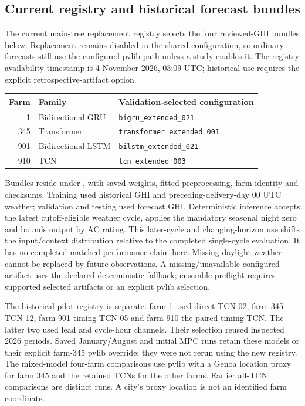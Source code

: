 \documentclass[11pt,a4paper]{article}
\begin{document}
\subsection{Current registry and historical forecast bundles}
The current main-tree replacement registry selects the four reviewed-GHI
bundles below. Replacement remains disabled in the shared configuration, so
ordinary forecasts still use the configured pvlib path unless a study enables
it. The registry availability timestamp is 4 November 2026, 03:09 UTC;
historical use requires the explicit retrospective-artifact option.
\begin{center}\small
\begin{tabular}{rll}
\toprule Farm & Family & Validation-selected configuration\\\midrule
1 & Bidirectional GRU & \texttt{bigru\_extended\_021}\\
345 & Transformer & \texttt{transformer\_extended\_001}\\
901 & Bidirectional LSTM & \texttt{bilstm\_extended\_021}\\
910 & TCN & \texttt{tcn\_extended\_003}\\
\bottomrule\end{tabular}\end{center}
Bundles reside under , with saved
weights, fitted preprocessing, farm identity and checksums. Training used
historical GHI and preceding-delivery-day 00 UTC weather; validation and testing
used forecast GHI. Deterministic inference accepts the latest cutoff-eligible
weather cycle, applies the mandatory seasonal night zero and bounds output by
AC rating. This later-cycle and changing-horizon use shifts the input/context
distribution relative to the completed single-cycle evaluation. It has no
completed matched performance claim here. Missing daylight weather cannot be
replaced by future observations. A missing/unavailable configured artifact uses
the declared deterministic fallback; ensemble preflight requires supported
selected artifacts or an explicit pvlib selection.

The historical pilot registry is separate: farm 1 used direct TCN 02, farm 345
TCN 12, farm 901 timing TCN 05 and farm 910 the paired timing TCN. The latter
two used lead and cycle-hour channels. Their selection reused inspected 2026
periods. Saved January/August and initial MPC runs retain these models or their
explicit farm-345 pvlib override; they were not rerun using the new registry.
The mixed-model four-farm comparisons use pvlib with a Genoa location proxy for
farm 345 and the retained TCNs for the other farms. Earlier all-TCN comparisons
are distinct runs. A city's proxy location is not an identified farm coordinate.
\end{document}
